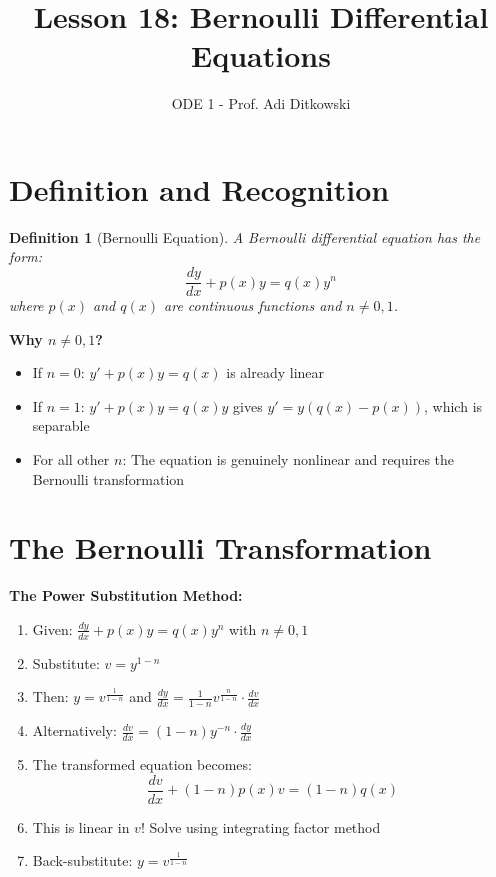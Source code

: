 \documentclass[12pt]{article}
\title{Lesson 18: Bernoulli Differential Equations}
\author{ODE 1 - Prof. Adi Ditkowski}
\date{}
\newtheorem{definition}{Definition}
\begin{document}
\maketitle

\section{Definition and Recognition}

\begin{definition}[Bernoulli Equation]
A Bernoulli differential equation has the form:
$$\frac{dy}{dx} + p(x)y = q(x)y^n$$
where $p(x)$ and $q(x)$ are continuous functions and $n \neq 0, 1$.
\end{definition}

\begin{keypoint}
\textbf{Why $n \neq 0, 1$?}
\begin{itemize}
    \item If $n = 0$: $y' + p(x)y = q(x)$ is already linear
    \item If $n = 1$: $y' + p(x)y = q(x)y$ gives $y' = y(q(x) - p(x))$, which is separable
    \item For all other $n$: The equation is genuinely nonlinear and requires the Bernoulli transformation
\end{itemize}
\end{keypoint}

\section{The Bernoulli Transformation}

\begin{transformation}
\textbf{The Power Substitution Method:}
\begin{enumerate}
    \item Given: $\frac{dy}{dx} + p(x)y = q(x)y^n$ with $n \neq 0, 1$
    \item Substitute: $v = y^{1-n}$
    \item Then: $y = v^{\frac{1}{1-n}}$ and $\frac{dy}{dx} = \frac{1}{1-n}v^{\frac{n}{1-n}} \cdot \frac{dv}{dx}$
    \item Alternatively: $\frac{dv}{dx} = (1-n)y^{-n} \cdot \frac{dy}{dx}$
    \item The transformed equation becomes:
    $$\frac{dv}{dx} + (1-n)p(x)v = (1-n)q(x)$$
    \item This is linear in $v$! Solve using integrating factor method
    \item Back-substitute: $y = v^{\frac{1}{1-n}}$
\end{enumerate}
\end{transformation}
\end{document}
